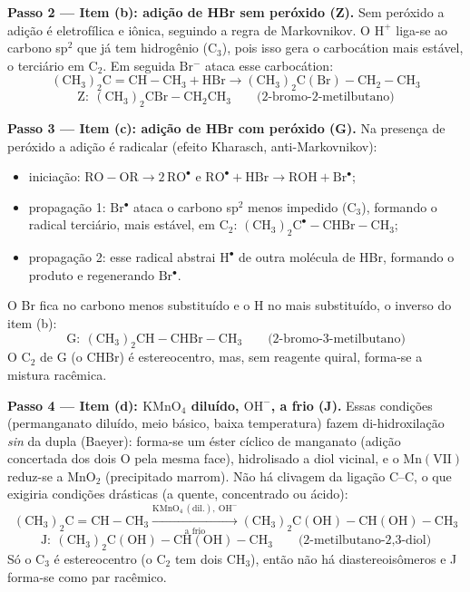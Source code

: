 \documentclass{article}%
\begin{document}
\textbf{Passo 2 --- Item (b): adição de HBr sem peróxido (Z).}
Sem peróxido a adição é eletrofílica e iônica, seguindo a regra de Markovnikov. O $\mathrm{H^+}$ liga-se ao carbono sp$^2$ que já tem hidrogênio ($\mathrm{C}_3$), pois isso gera o carbocátion mais estável, o terciário em $\mathrm{C}_2$. Em seguida $\mathrm{Br^-}$ ataca esse carbocátion:
\[
\mathrm{(CH_3)_2C{=}CH{-}CH_3 + HBr \longrightarrow (CH_3)_2C(Br){-}CH_2{-}CH_3}
\]
\[
\boxed{\mathrm{Z:\ (CH_3)_2CBr{-}CH_2CH_3}}\qquad\text{(2-bromo-2-metilbutano)}
\]

\textbf{Passo 3 --- Item (c): adição de HBr com peróxido (G).}
Na presença de peróxido a adição é radicalar (efeito Kharasch, anti-Markovnikov):
\begin{itemize}
\item iniciação: $\mathrm{RO{-}OR \to 2\,RO^{\bullet}}$ e $\mathrm{RO^{\bullet} + HBr \to ROH + Br^{\bullet}}$;
\item propagação 1: $\mathrm{Br^{\bullet}}$ ataca o carbono sp$^2$ menos impedido ($\mathrm{C}_3$), formando o radical terciário, mais estável, em $\mathrm{C}_2$: $\mathrm{(CH_3)_2C^{\bullet}{-}CHBr{-}CH_3}$;
\item propagação 2: esse radical abstrai $\mathrm{H^{\bullet}}$ de outra molécula de HBr, formando o produto e regenerando $\mathrm{Br^{\bullet}}$.
\end{itemize}
O Br fica no carbono menos substituído e o H no mais substituído, o inverso do item (b):
\[
\boxed{\mathrm{G:\ (CH_3)_2CH{-}CHBr{-}CH_3}}\qquad\text{(2-bromo-3-metilbutano)}
\]
O $\mathrm{C}_2$ de G (o $\mathrm{CHBr}$) é estereocentro, mas, sem reagente quiral, forma-se a mistura racêmica.

\textbf{Passo 4 --- Item (d): $\mathrm{KMnO_4}$ diluído, $\mathrm{OH^-}$, a frio (J).}
Essas condições (permanganato diluído, meio básico, baixa temperatura) fazem di-hidroxilação \emph{sin} da dupla (Baeyer): forma-se um éster cíclico de manganato (adição concertada dos dois O pela mesma face), hidrolisado a diol vicinal, e o $\mathrm{Mn(VII)}$ reduz-se a $\mathrm{MnO_2}$ (precipitado marrom). Não há clivagem da ligação C--C, o que exigiria condições drásticas (a quente, concentrado ou ácido):
\[
\mathrm{(CH_3)_2C{=}CH{-}CH_3 \xrightarrow[\ \text{a frio}\ ]{KMnO_4\,(dil.),\ OH^-} (CH_3)_2C(OH){-}CH(OH){-}CH_3}
\]
\[
\boxed{\mathrm{J:\ (CH_3)_2C(OH){-}CH(OH){-}CH_3}}\qquad\text{(2-metilbutano-2,3-diol)}
\]
Só o $\mathrm{C}_3$ é estereocentro (o $\mathrm{C}_2$ tem dois $\mathrm{CH_3}$), então não há diastereoisômeros e J forma-se como par racêmico.
\end{document}
